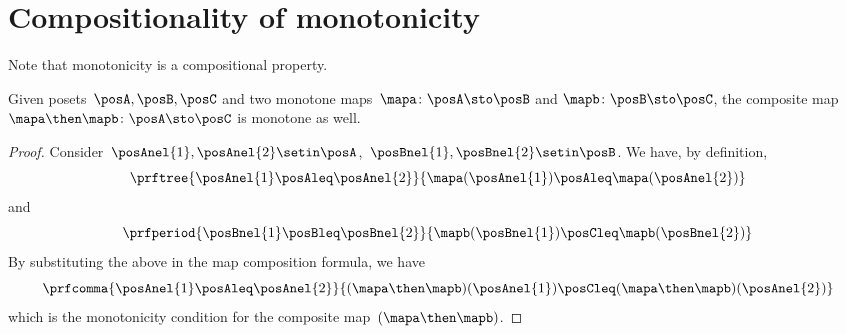 
\section{Compositionality of monotonicity}
Note that monotonicity is a compositional property.
\begin{lemma}
    Given posets~$\posA,\posB,\posC$ and two monotone maps~$\mapa\colon \posA \sto \posB$ and $\mapb\colon \posB \sto \posC$, the composite map~$\mapa\then \mapb\colon \posA \sto \posC$ is monotone as well.
\end{lemma}
\begin{proof}
    Consider~$\posAnel{1},\posAnel{2} \setin \posA$,~$\posBnel{1},\posBnel{2}\setin \posB$.
    We have, by definition,
    \begin{equation}
        \prftree{\posAnel{1}\posAleq \posAnel{2}}{\mapa(\posAnel{1})\posAleq \mapa(\posAnel{2})}
    \end{equation}
    and
    \begin{equation}
        \prfperiod{\posBnel{1}\posBleq \posBnel{2}}{\mapb(\posBnel{1})\posCleq \mapb(\posBnel{2})}
    \end{equation}
    By substituting the above in the map composition formula, we have
    \begin{equation}
        \prfcomma{\posAnel{1}\posAleq \posAnel{2} }{ (\mapa\then \mapb)(\posAnel{1}) \posCleq (\mapa\then \mapb)(\posAnel{2})}
    \end{equation}
    which is the monotonicity condition for the composite map~$(\mapa\then \mapb)$.
\end{proof}
